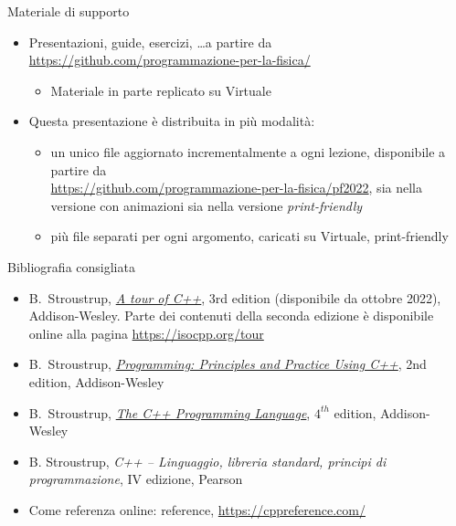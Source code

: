 \begin{frame}{Materiale di supporto}

  \begin{itemize}

  \item Presentazioni, guide, esercizi, \ldots a partire da
    \url{https://github.com/programmazione-per-la-fisica/}
    \begin{itemize}
    \item Materiale in parte replicato su Virtuale
    \end{itemize}

  \item Questa presentazione è distribuita in più modalità:
    \begin{itemize}
    \item un unico file  aggiornato incrementalmente a ogni lezione,
      disponibile a partire da\\
      {\smaller \url{https://github.com/programmazione-per-la-fisica/pf2022}},
      sia nella versione con animazioni sia nella versione
      \textit{print-friendly}
    \item più file  separati per ogni argomento, caricati su Virtuale,
      print-friendly
    \end{itemize}

  \end{itemize}

\end{frame}

\begin{frame}{Bibliografia consigliata}

  \begin{itemize}
  \item B.~Stroustrup, \href{https://stroustrup.com/tour3.html}{\textit{A tour
        of C++}}, 3rd edition (disponibile da ottobre 2022), Addison-Wesley.
    Parte dei contenuti della seconda edizione è disponibile online alla pagina
    \url{https://isocpp.org/tour}

  \item B.~Stroustrup,
    \href{https://stroustrup.com/programming.html}{\textit{Programming:
        Principles and Practice Using C++}}, 2nd edition, Addison-Wesley

  \item B.~Stroustrup, \href{https://stroustrup.com/4th.html}{\textit{The C++
        Programming Language}}, $4^{th}$ edition, Addison-Wesley

  \item B. Stroustrup, \textit{C++ -- Linguaggio, libreria standard, principi
      di programmazione}, IV edizione, Pearson

  \item Come referenza online: \Cpp{} reference, \url{https://cppreference.com/}

  \end{itemize}
\end{frame}

